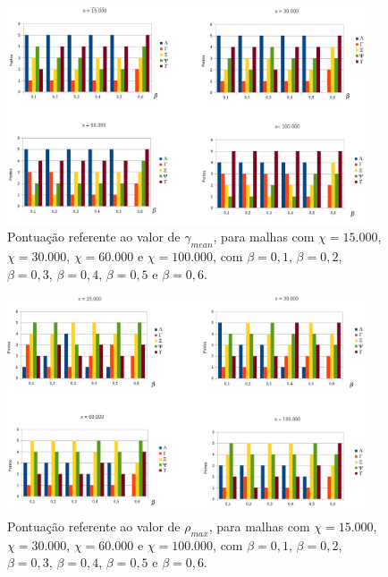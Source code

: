 \begin{figure}[!ht]
  \centering
  \includegraphics[width=300pt]{imagens_resultados/gamma_mean.png}
  \caption{\footnotesize{Pontuação referente ao valor de $\gamma_{mean}$, para malhas com $\chi = 15.000$, $\chi = 30.000$, $\chi = 60.000$ e $\chi = 100.000$, com $\beta = 0,1$, $\beta = 0,2$, $\beta = 0,3$, $\beta = 0,4$, $\beta = 0,5$ e $\beta = 0,6$.
   \label{grafico_gamma_mean}
}}
\end{figure}

\begin{figure}[!ht]
  \centering
  \includegraphics[width=300pt]{imagens_resultados/rho_max.png}
  \caption{\footnotesize{Pontuação referente ao valor de $\rho_{max}$, para malhas com $\chi = 15.000$, $\chi = 30.000$, $\chi = 60.000$ e $\chi = 100.000$, com $\beta = 0,1$, $\beta = 0,2$, $\beta = 0,3$, $\beta = 0,4$, $\beta = 0,5$ e $\beta = 0,6$.
   \label{grafico_rho_max}
}}
\end{figure}

